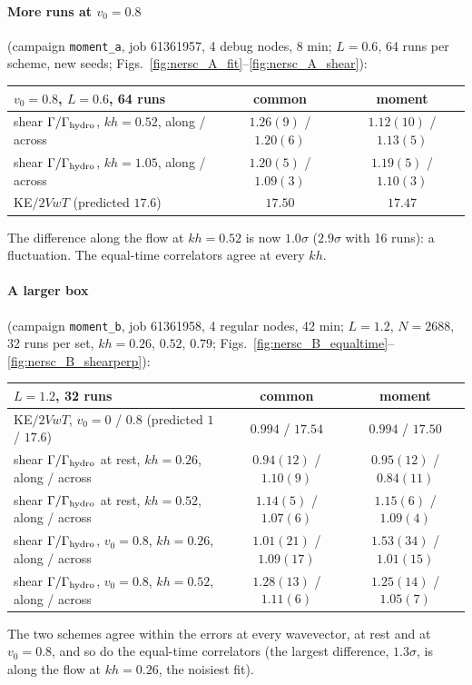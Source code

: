 \documentclass[11pt,aps,preprint,nofootinbib,superscriptaddress,tightenlines]{revtex4-2}
\let\oldparagraph\paragraph
\renewcommand{\paragraph}{\par\bigskip\oldparagraph}
\begin{document}
\paragraph{More runs at $v_0=0.8$} (campaign \texttt{moment\_a}, job 61361957, 4 debug nodes, 8 min; $L=0.6$, 64 runs per scheme, new seeds;
Figs.~\ref{fig:nersc_A_fit}--\ref{fig:nersc_A_shear}):
\begin{center}
\begin{tabular}{lcc}
\hline
$v_0=0.8$, $L=0.6$, 64 runs & common & moment \\ \hline
shear $\Gamma/\Gamma_{\rm hydro}$, $kh=0.52$, along / across & $1.26(9)$ / $1.20(6)$ & $1.12(10)$ / $1.13(5)$ \\
shear $\Gamma/\Gamma_{\rm hydro}$, $kh=1.05$, along / across & $1.20(5)$ / $1.09(3)$ & $1.19(5)$ / $1.10(3)$ \\
KE$/2VwT$ (predicted $17.6$) & $17.50$ & $17.47$ \\
\hline
\end{tabular}
\end{center}
The difference along the flow at $kh=0.52$ is now $1.0\sigma$ ($2.9\sigma$ with 16 runs): a fluctuation.  The equal-time correlators agree at
every $kh$.

\paragraph{A larger box} (campaign \texttt{moment\_b}, job 61361958, 4 regular nodes, 42 min; $L=1.2$, $N=2688$, 32 runs per set, $kh=0.26$, $0.52$,
$0.79$; Figs.~\ref{fig:nersc_B_equaltime}--\ref{fig:nersc_B_shearperp}):
\begin{center}
\begin{tabular}{lcc}
\hline
$L=1.2$, 32 runs & common & moment \\ \hline
KE$/2VwT$, $v_0=0$ / $0.8$ (predicted $1$ / $17.6$) & $0.994$ / $17.54$ & $0.994$ / $17.50$ \\
shear $\Gamma/\Gamma_{\rm hydro}$ at rest, $kh=0.26$, along / across & $0.94(12)$ / $1.10(9)$ & $0.95(12)$ / $0.84(11)$ \\
shear $\Gamma/\Gamma_{\rm hydro}$ at rest, $kh=0.52$, along / across & $1.14(5)$ / $1.07(6)$ & $1.15(6)$ / $1.09(4)$ \\
shear $\Gamma/\Gamma_{\rm hydro}$, $v_0=0.8$, $kh=0.26$, along / across & $1.01(21)$ / $1.09(17)$ & $1.53(34)$ / $1.01(15)$ \\
shear $\Gamma/\Gamma_{\rm hydro}$, $v_0=0.8$, $kh=0.52$, along / across & $1.28(13)$ / $1.11(6)$ & $1.25(14)$ / $1.05(7)$ \\
\hline
\end{tabular}
\end{center}
The two schemes agree within the errors at every wavevector, at rest and at $v_0=0.8$, and so do the equal-time correlators (the largest
difference, $1.3\sigma$, is along the flow at $kh=0.26$, the noisiest fit).
\end{document}
